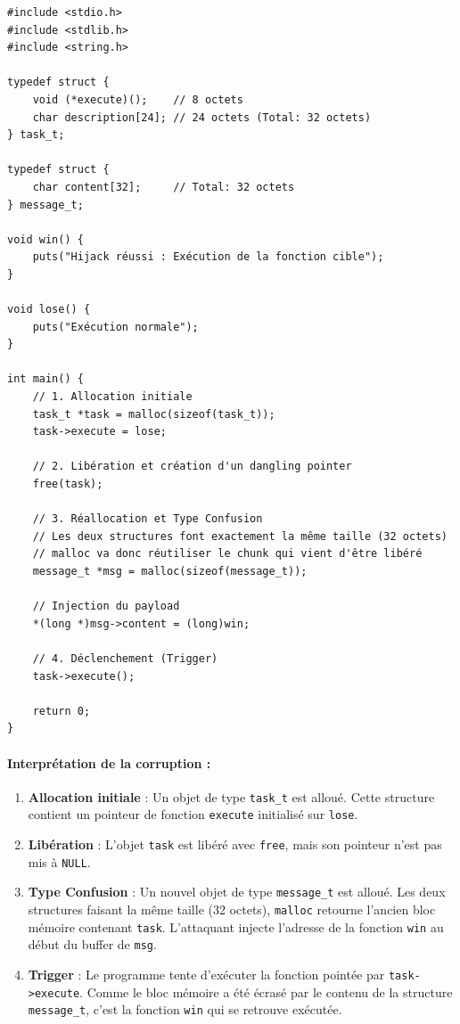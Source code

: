 \begin{verbatim}
#include <stdio.h>
#include <stdlib.h>
#include <string.h>

typedef struct {
    void (*execute)();    // 8 octets
    char description[24]; // 24 octets (Total: 32 octets)
} task_t;

typedef struct {
    char content[32];     // Total: 32 octets
} message_t;

void win() {
    puts("Hijack réussi : Exécution de la fonction cible");
}

void lose() {
    puts("Exécution normale");
}

int main() {
    // 1. Allocation initiale
    task_t *task = malloc(sizeof(task_t));
    task->execute = lose;

    // 2. Libération et création d'un dangling pointer
    free(task);

    // 3. Réallocation et Type Confusion
    // Les deux structures font exactement la même taille (32 octets)
    // malloc va donc réutiliser le chunk qui vient d'être libéré
    message_t *msg = malloc(sizeof(message_t));

    // Injection du payload
    *(long *)msg->content = (long)win;

    // 4. Déclenchement (Trigger)
    task->execute(); 

    return 0;
}
\end{verbatim}

\paragraph{Interprétation de la corruption :}
\begin{enumerate}
    \item \textbf{Allocation initiale} : Un objet de type \texttt{task\_t} est alloué. Cette structure contient un pointeur de fonction \texttt{execute} initialisé sur \texttt{lose}.
    \item \textbf{Libération} : L'objet \texttt{task} est libéré avec \texttt{free}, mais son pointeur n'est pas mis à \texttt{NULL}.
    \item \textbf{Type Confusion} : Un nouvel objet de type \texttt{message\_t} est alloué. Les deux structures faisant la même taille (32 octets), \texttt{malloc} retourne l'ancien bloc mémoire contenant \texttt{task}. L'attaquant injecte l'adresse de la fonction \texttt{win} au début du buffer de \texttt{msg}.
    \item \textbf{Trigger} : Le programme tente d'exécuter la fonction pointée par \texttt{task->execute}. Comme le bloc mémoire a été écrasé par le contenu de la structure \texttt{message\_t}, c'est la fonction \texttt{win} qui se retrouve exécutée.
\end{enumerate}
